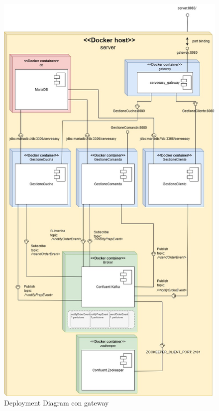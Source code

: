 \begin{figure}[htbp]
	\centering
	\includegraphics[scale=0.35]{iterazione3/images/Deployment_iterazione3.jpg}
	\caption{Deployment Diagram con gateway
 \label{fig:deploymentdiagram}}
\end{figure}
\clearpage